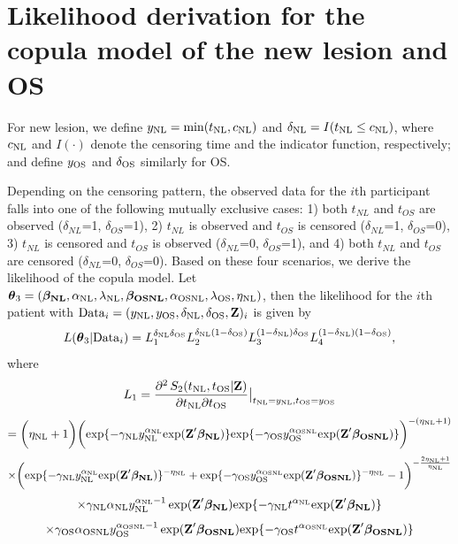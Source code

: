 \documentclass[12pt]{article}
\begin{document}
\newpage
\section{Likelihood derivation for the copula model of the new lesion and OS}
For new lesion, we define $y_{\rm NL}=\mathrm{min}(t_{\rm NL}, c_{\rm NL})$ and
$\delta_{\rm NL}=I(t_{\rm NL} \le c_{\rm NL})$,
where $c_{\rm NL}$ and $I(\cdot)$ denote the censoring time and the indicator function,
respectively; and define $y_{\rm OS}$ and $\delta_{\rm OS}$ similarly for OS.

Depending on the censoring pattern, the observed data for the $i$th participant falls into one of the following mutually exclusive cases: 1) both $t_{NL}$ and $t_{OS}$ are observed ($\delta_{NL}$=1, $\delta_{OS}$=1), 2) $t_{NL}$ is observed and $t_{OS}$ is censored ($\delta_{NL}$=1, $\delta_{OS}$=0), 3) $t_{NL}$ is censored and $t_{OS}$ is observed ($\delta_{NL}$=0, $\delta_{OS}$=1), and 4) both $t_{NL}$ and $t_{OS}$ are censored ($\delta_{NL}$=0, $\delta_{OS}$=0). Based on these four scenarios, we derive the likelihood of the copula model. 
Let
$\boldsymbol{\theta}_3=(\boldsymbol{\beta_{\rm NL}}, \alpha_{\rm NL}, \lambda_{\rm NL}, \boldsymbol{\beta_{\rm OSNL}},
\alpha_{\rm OSNL}, \lambda_{\rm OS}, \eta_{\rm NL})$,  then the likelihood for the $i$th patient with ${\rm Data}_i=(y_{\rm NL}, y_{\rm OS},
\delta_{\rm NL}, \delta_{\rm OS}, \textbf{Z})_i$ is given by
$$
L(\boldsymbol{\theta}_3|{\rm Data}_i)
=L_1^{\delta_{\rm NL}\delta_{\rm OS}}
L_2^{\delta_{\rm NL}(1-\delta_{\rm OS})}L_3^{(1-\delta_{\rm NL})\delta_{\rm OS}}
L_4^{(1-\delta_{\rm NL})(1-\delta_{\rm OS})}, 
$$
where
$$
L_1=\frac{\partial^2\, S_2(t_{\rm NL}, t_{\rm OS}|\textbf{Z})}{\partial t_{\rm NL} \partial t_{\rm OS}}\big|_{t_{\rm NL}=y_{\rm NL},t_{\rm OS}=y_{\rm OS}}
$$
$$
=\bigg(\eta_{\rm NL}+1\bigg)\bigg(\mathrm{exp}\{-\gamma_{\rm NL} y_{\rm NL}^{\alpha_{\rm NL}}
\mathrm{exp}(\textbf{Z}' \boldsymbol{\beta_{\rm NL}} )\} \mathrm{exp}\{-\gamma_{\rm OS} y_{\rm OS}^{\alpha_{\rm OSNL}}
\mathrm{exp}(\textbf{Z}' \boldsymbol{\beta_{\rm OSNL}} )\}\bigg)^{-(\eta_{\rm NL}+1)}
$$
$$
\times \bigg(\mathrm{exp}\{-\gamma_{\rm NL} y_{\rm NL}^{\alpha_{\rm NL}}
\mathrm{exp}(\textbf{Z}' \boldsymbol{\beta_{\rm NL}} )\}^{-\eta_{\rm NL}}+\mathrm{exp}\{-\gamma_{\rm OS} y_{\rm OS}^{\alpha_{\rm OSNL}}
\mathrm{exp}(\textbf{Z}' \boldsymbol{\beta_{\rm OSNL}} )\}^{-\eta_{\rm NL}}-1\bigg)^{-\frac{2\eta_{\rm NL}+1}{\eta_{\rm NL}}}
$$
$$
\times \gamma_{\rm NL} \alpha_{\rm NL} y_{\rm NL}^{{\alpha_{\rm NL} -1}} \exp(\textbf{Z}' \boldsymbol{\beta_{\rm NL}}) \mathrm{exp}\{-\gamma_{\rm NL} t^{\alpha_{\rm NL}}
\mathrm{exp}(\textbf{Z}' \boldsymbol{\beta_{\rm NL}} )\}
$$
$$
\times \gamma_{\rm OS} \alpha_{\rm OSNL} y_{\rm OS}^{{\alpha_{\rm OSNL} -1}} \exp(\textbf{Z}' \boldsymbol{\beta_{\rm OSNL}}) \mathrm{exp}\{-\gamma_{\rm OS} t^{\alpha_{\rm OSNL}}
\mathrm{exp}(\textbf{Z}' \boldsymbol{\beta_{\rm OSNL}} )\}
$$
\end{document}
